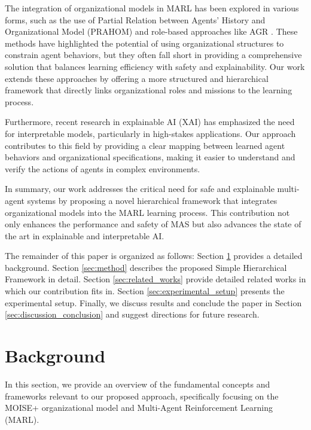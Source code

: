 \documentclass[sigconf,anonymous]{aamas}
\begin{document}
The integration of organizational models in MARL has been explored in various forms, such as the use of Partial Relation between Agents' History and Organizational Model (PRAHOM) and role-based approaches like AGR \cite{agr_reference}. These methods have highlighted the potential of using organizational structures to constrain agent behaviors, but they often fall short in providing a comprehensive solution that balances learning efficiency with safety and explainability. Our work extends these approaches by offering a more structured and hierarchical framework that directly links organizational roles and missions to the learning process.

Furthermore, recent research in explainable AI (XAI) \cite{xai_reference} has emphasized the need for interpretable models, particularly in high-stakes applications. Our approach contributes to this field by providing a clear mapping between learned agent behaviors and organizational specifications, making it easier to understand and verify the actions of agents in complex environments.

In summary, our work addresses the critical need for safe and explainable multi-agent systems by proposing a novel hierarchical framework that integrates organizational models into the MARL learning process. This contribution not only enhances the performance and safety of MAS but also advances the state of the art in explainable and interpretable AI.

The remainder of this paper is organized as follows: Section \ref{sec:background} provides a detailed background. Section \ref{sec:method} describes the proposed Simple Hierarchical Framework in detail. Section \ref{sec:related_works} provide detailed related works in which our contribution fits in. Section \ref{sec:experimental_setup} presents the experimental setup. Finally, we discuss results and conclude the paper in Section \ref{sec:discussion_conclusion} and suggest directions for future research.



\section{Background}
\label{sec:background}

In this section, we provide an overview of the fundamental concepts and frameworks relevant to our proposed approach, specifically focusing on the MOISE+ organizational model and Multi-Agent Reinforcement Learning (MARL).
\end{document}
